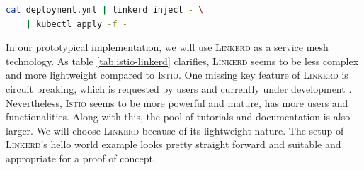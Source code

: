 \begin{lstlisting}[language=bash,caption={Injection of sidecards into a deployment in \textsc{Linkerd}}, label={lst:linkerd}]
cat deployment.yml | linkerd inject - \
	| kubectl apply -f -
\end{lstlisting}

%
% 

In our prototypical implementation, we will use \textsc{Linkerd} as a service mesh technology. As table \ref{tab:istio-linkerd} clarifies, \textsc{Linkerd} seems to be less complex and more lightweight compared to \textsc{Istio}. One missing key feature of \textsc{Linkerd} is circuit breaking, which is requested by users and currently under development \cite{linkerd-circuit-breaker}. Nevertheless, \textsc{Istio} seems to be more powerful and mature, has more users and functionalities. Along with this, the pool of tutorials and documentation is also larger.
We will choose \textsc{Linkerd} because of its lightweight nature. The setup of \textsc{Linkerd}'s hello world example looks pretty straight forward and suitable and appropriate for a proof of concept.